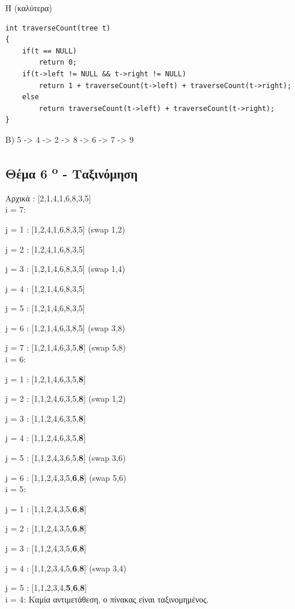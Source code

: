\documentclass[a4paper,10pt]{article}
\begin{document}
Ή (καλύτερα)\\
\begin{verbatim}
int traverseCount(tree t)
{
    if(t == NULL)
        return 0;
    if(t->left != NULL && t->right != NULL)
        return 1 + traverseCount(t->left) + traverseCount(t->right);
    else
        return traverseCount(t->left) + traverseCount(t->right);
}
\end{verbatim}

B)
5 -> 4 -> 2 -> 8 -> 6 -> 7 -> 9

\subsection{Θέμα 6 \textsuperscript{o} - Ταξινόμηση}
Αρχικά : [2,1,4,1,6,8,3,5]\\
i = 7:

j = 1 : [1,2,4,1,6,8,3,5] (swap 1,2)

j = 2 : [1,2,4,1,6,8,3,5]

j = 3 : [1,2,1,4,6,8,3,5] (swap 1,4)

j = 4 : [1,2,1,4,6,8,3,5]

j = 5 : [1,2,1,4,6,8,3,5]

j = 6 : [1,2,1,4,6,3,8,5] (swap 3,8)

j = 7 : [1,2,1,4,6,3,5,\textbf{8}] (swap 5,8)
\\
i = 6:

j = 1 : [1,2,1,4,6,3,5,\textbf{8}]

j = 2 : [1,1,2,4,6,3,5,\textbf{8}] (swap 1,2)

j = 3 : [1,1,2,4,6,3,5,\textbf{8}]

j = 4 : [1,1,2,4,6,3,5,\textbf{8}]

j = 5 : [1,1,2,4,3,6,5,\textbf{8}] (swap 3,6)

j = 6 : [1,1,2,4,3,5,\textbf{6},\textbf{8}] (swap 5,6)
\\
i = 5:

j = 1 : [1,1,2,4,3,5,\textbf{6},\textbf{8}]

j = 2 : [1,1,2,4,3,5,\textbf{6},\textbf{8}]

j = 3 : [1,1,2,4,3,5,\textbf{6},\textbf{8}]

j = 4 : [1,1,2,3,4,5,\textbf{6},\textbf{8}] (swap 3,4)

j = 5 : [1,1,2,3,4,\textbf{5},\textbf{6},\textbf{8}]
\\
i = 4: Καμία αντιμετάθεση, ο πίνακας είναι ταξινομημένος.

\end{document}

